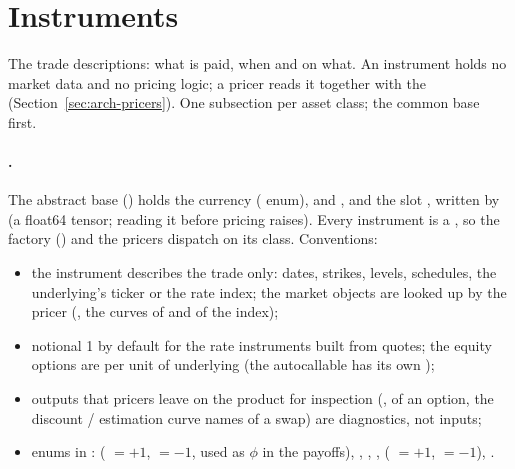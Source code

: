 \section{Instruments}\label{sec:arch-instruments}
The trade descriptions: what is paid, when and on what. An instrument holds no market data and no pricing logic; a
pricer reads it together with the  (Section~\ref{sec:arch-pricers}). One subsection per asset
class; the common base first.

\paragraph{.} The abstract base () holds the currency 
( enum),  and , and the slot , written by
 (a float64 tensor; reading it before pricing raises). Every instrument is a , so the
factory () and the pricers dispatch on its class. Conventions:
\begin{itemize}[nosep]
  \item the instrument describes the trade only: dates, strikes, levels, schedules, the underlying's ticker or the rate
        index; the market objects are looked up by the pricer (,
        the curves of  and of the index);
  \item notional 1 by default for the rate instruments built from quotes; the equity options are per unit of
        underlying (the autocallable has its own );
  \item outputs that pricers leave on the product for inspection (,  of an
        option, the discount / estimation curve names of a swap) are diagnostics, not inputs;
  \item enums in :  ( $= +1$,  $= -1$, used as
        $\phi$ in the payoffs), , , , 
        ( $= +1$,  $= -1$), .
\end{itemize}


